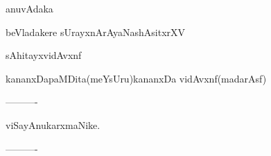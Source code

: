\documentclass{article}
\begin{document}
\begin{center}
anuvAdaka
\end{center}

\begin{center}
beVladakere sUrayxnArAyaNashAsitxrXV
\end{center}

\begin{center}
sAhitayxvidAvxnf
\end{center}

\begin{center}
kananxDapaMDita(meYsUru)kananxDa vidAvxnf(madarAsf)
\end{center}

\begin{center}
----------
\end{center}

\begin{center}
viSayAnukarxmaNike.
\end{center}

\begin{center}
----------
\end{center}
\end{document}
